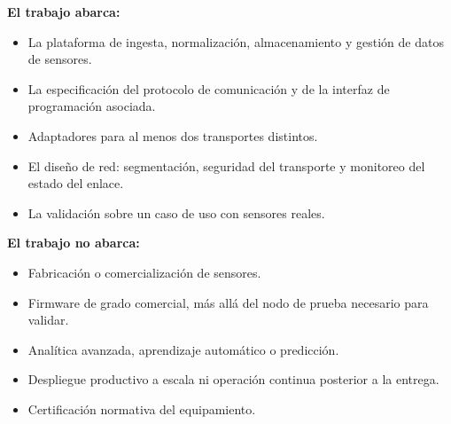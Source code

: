 \begin{minipage}[t]{0.48\textwidth}
\textbf{El trabajo abarca:}
\begin{itemize}
\item La plataforma de ingesta, normalización, almacenamiento y gestión de datos de sensores.
\item La especificación del protocolo de comunicación y de la interfaz de programación asociada.
\item Adaptadores para al menos dos transportes distintos.
\item El diseño de red: segmentación, seguridad del transporte y monitoreo del estado del enlace.
\item La validación sobre un caso de uso con sensores reales.
\end{itemize}
\end{minipage}\hfill
\begin{minipage}[t]{0.48\textwidth}
\textbf{El trabajo no abarca:}
\begin{itemize}
\item Fabricación o comercialización de sensores.
\item Firmware de grado comercial, más allá del nodo de prueba necesario para validar.
\item Analítica avanzada, aprendizaje automático o predicción.
\item Despliegue productivo a escala ni operación continua posterior a la entrega.
\item Certificación normativa del equipamiento.
\end{itemize}
\end{minipage}
